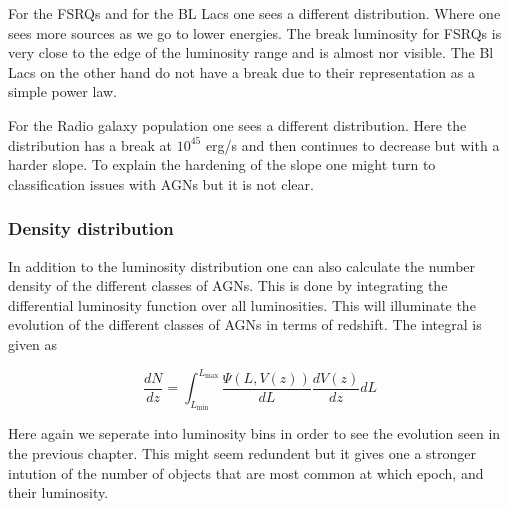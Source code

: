 \documentclass{article}
\begin{document}
For the FSRQs and for the BL Lacs one sees a different distribution. Where one sees more sources as we go to lower energies. The break luminosity for FSRQs 
is very close to the edge of the luminosity range and is almost nor visible. The Bl Lacs on the other hand do not have a break 
due to their representation as a simple power law.  

For the Radio galaxy population one sees a different distribution. Here the distribution has a break at $10^{45}$ erg/s and then continues to 
decrease but with a harder slope. To explain the hardening of the slope one might turn to classification issues with AGNs but it is not clear.


\subsubsection{Density distribution}

In addition to the luminosity distribution one can also calculate the number density of the different classes of AGNs. This is done by integrating the
differential luminosity function over all luminosities. This will illuminate the evolution of the different classes of AGNs in terms of redshift. The integral is given as

\begin{equation}
    \frac{dN}{dz} = \int_{L_{\text{min}}}^{L_{\text{max}}} \frac{\Psi(L, V(z))}{dL} \frac{dV(z)}{dz} dL
\end{equation}

Here again we seperate into luminosity bins in order to see the evolution seen in the previous chapter. This might seem redundent but
it gives one a stronger intution of the number of objects that are most common at which epoch, and their luminosity. 
\end{document}
